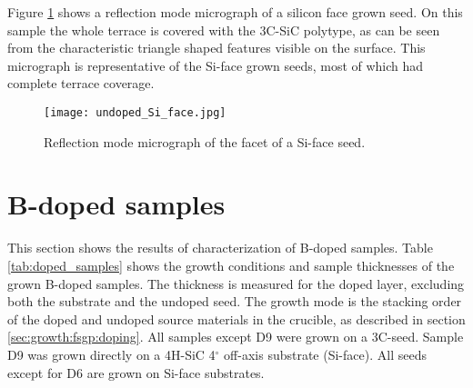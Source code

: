 Figure \ref{fig:silicon_seed} shows a reflection mode micrograph of a silicon face grown seed. On this sample the whole terrace is covered with the 3C-SiC polytype, as can be seen from the characteristic triangle shaped features visible on the surface. This micrograph is representative of the Si-face grown seeds, most of which had complete terrace coverage. 

\begin{figure}[H]
\begin{center}
\texttt{[image: undoped\_Si\_face.jpg]}
\caption{Reflection mode micrograph of the facet of a Si-face seed.
\label{fig:silicon_seed}}
\end{center}
\end{figure}




\section{B-doped samples}
\label{sec:results:doped}
This section shows the results of characterization of B-doped samples. Table \ref{tab:doped_samples} shows the growth conditions and sample thicknesses of the grown B-doped samples. The thickness is measured for the doped layer, excluding both the substrate and the undoped seed. The growth mode is the stacking order of the doped and undoped source materials in the crucible, as described in section \ref{sec:growth:fsgp:doping}. All samples except D9 were grown on a 3C-seed. Sample D9 was grown directly on a 4H-SiC 4$^\circ$ off-axis substrate (Si-face). All seeds except for D6 are grown on Si-face substrates. 


